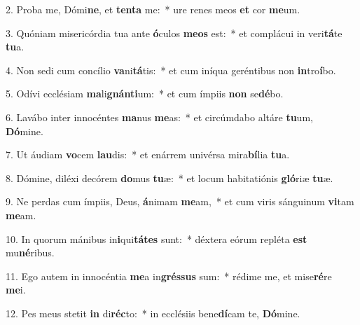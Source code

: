 2. Proba me, Dómi\textbf{ne}, et \textbf{ten}\textbf{ta} me:~*  ure renes meos \textbf{et} cor \textbf{me}um.\

3. Quóniam misericórdia tua ante \textbf{ó}culos \textbf{me}\textbf{os} est:~*  et complácui in veri\textbf{tá}te \textbf{tu}a.\

4. Non sedi cum concílio \textbf{va}ni\textbf{tá}tis:~*  et cum iníqua geréntibus non \textbf{in}tro\textbf{í}bo.\

5. Odívi ecclésiam \textbf{ma}li\textbf{gnán}\textbf{ti}um:~*  et cum ímpiis \textbf{non} se\textbf{dé}bo.\

6. Lavábo inter innocéntes \textbf{ma}nus \textbf{me}as:~*  et circúmdabo altáre \textbf{tu}um, \textbf{Dó}mine.\

7. Ut áudiam \textbf{vo}cem \textbf{lau}dis:~*  et enárrem univérsa mira\textbf{bí}lia \textbf{tu}a.\

8. Dómine, diléxi decórem \textbf{do}mus \textbf{tu}æ:~*  et locum habitatiónis \textbf{gló}riæ \textbf{tu}æ.\

9. Ne perdas cum ímpiis, Deus, \textbf{á}nimam \textbf{me}am,~*  et cum viris sánguinum \textbf{vi}tam \textbf{me}am.\

10. In quorum mánibus in\textbf{i}qui\textbf{tá}\textbf{tes} sunt:~*  déxtera eórum repléta \textbf{est} mu\textbf{né}ribus.\

11. Ego autem in innocéntia \textbf{me}a in\textbf{grés}\textbf{sus} sum:~*  rédime me, et mise\textbf{ré}re \textbf{me}i.\

12. Pes meus stetit \textbf{in} di\textbf{réc}to:~*  in ecclésiis bene\textbf{dí}cam te, \textbf{Dó}mine.\

